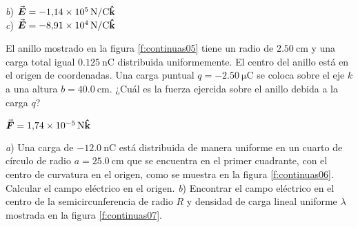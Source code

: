 \begin{Answer}
  \begin{minipage}[t]{.4\textwidth}
    \textit{b}) $\va*{E} = \SI{-1.14E5}{\newton/\coulomb}\vu{k}$\\ \textit{c}) $\va*{E} = \SI{-8.91E4}{\newton/\coulomb}\vu{k}$
  \end{minipage}
\end{Answer}
%
\begin{center}
\end{center}
%
\begin{Exercise}\label{p:continuas05}
  El anillo mostrado en la figura \ref{f:continuas05} tiene un radio de $\SI{2.50}{\centi\metre}$ y una carga total igual $\SI{0.125}{\nano\coulomb}$ distribuida uniformemente. El centro del anillo está en el origen de coordenadas. Una carga puntual $q = \SI{-2.50}{\micro\coulomb}$ se coloca sobre el eje $k$ a una altura $b = \SI{40.0}{\centi\metre}$. ¿Cuál es la fuerza ejercida sobre el anillo debida a la carga $q$?
\end{Exercise}
\begin{Answer}
  $\va*{F} = \SI{1.74E-5}{\newton}\vu{k}$
\end{Answer}
%
\begin{center}
\end{center}
%
\begin{Exercise}\label{p:continuas06}
  \textit{a}) Una carga de $\SI{-12.0}{\nano\coulomb}$ está distribuida de manera uniforme en un cuarto de círculo de radio $a = \SI{25.0}{\centi\metre}$ que se encuentra en el primer cuadrante, con el centro de curvatura en el origen, como se muestra en la figura \ref{f:continuas06}. Calcular el campo eléctrico en el origen. \textit{b}) Encontrar el campo eléctrico en el centro de la semicircunferencia de radio $R$ y densidad de carga lineal uniforme $\lambda$ mostrada en la figura \ref{f:continuas07}.
\end{Exercise}
